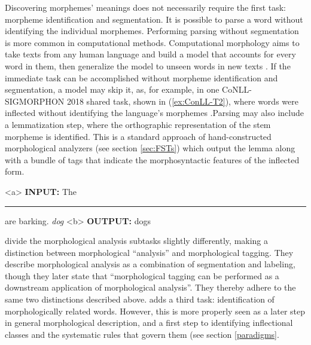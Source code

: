 \documentclass[12pt]{article}
\begin{document}
Discovering morphemes' meanings does not necessarily require the first task: morpheme identification and segmentation. It is possible to parse a word without identifying the individual morphemes. Performing parsing without segmentation is more common in computational methods. Computational morphology aims to take texts from any human language and build a model that accounts for every word in them, then generalize the model to unseen words in new texts \cite{goldsmith_computational_2017}. If the immediate task can be accomplished without morpheme identification and segmentation, a model may skip it, as, for example, in one CoNLL-SIGMORPHON 2018 shared task, shown in (\ref{ex:ConLL-T2}), where words were inflected without identifying the language's morphemes \cite{cotterell_conllsigmorphon_2018}.Parsing may also include a lemmatization step, where the orthographic representation of the stem morpheme is identified. This is a standard approach of hand-constructed morphological analyzers (see section \ref{sec:FSTs}) which output the lemma along with a bundle of tags that indicate the morphosyntactic features of the inflected form. 


\begin{singlespace}
\label{ex:ConLL-T2}
\a<a> \textbf{INPUT:}  The \rule{1cm}{0.15mm} are barking.  \hspace{5 mm} \textit{dog}
\label{ex:ConLL-T2a}
\a<b> \textbf{OUTPUT:} dogs
\label{ex:ConLL-T2b}
\xe
\end{singlespace}

 divide the morphological analysis subtasks slightly differently, making a distinction between morphological “analysis” and morphological tagging. They describe morphological analysis as a combination of segmentation and labeling, though they later state that ``morphological tagging can be performed as a downstream application of morphological analysis''.
They thereby adhere to the same two distinctions described above.  adds a third task: identification of morphologically related words. However, this is more properly seen as a later step in general morphological description, and a first step to identifying inflectional classes and the systematic rules that govern them (see section \ref{paradigms}. 
\end{document}
